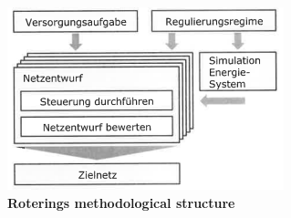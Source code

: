 \begin{figure}[h]
	\begin{centering}
		\centerline
		{\includegraphics[scale = 0.8]{figures/related_work/rotering_method.png}}
		\caption[rotering_method]{\textbf{Roterings methodological structure}}
		\label{fig:rotering_method}
	\end{centering}
\end{figure}
\FloatBarrier

